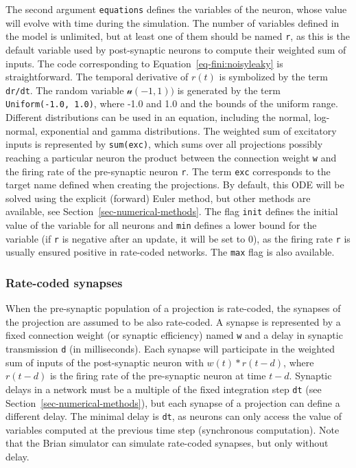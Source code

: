 \documentclass[
  11pt,
  a4paper,
]{scrbook}
\begin{document}
The second argument \texttt{equations} defines the variables of the
neuron, whose value will evolve with time during the simulation. The
number of variables defined in the model is unlimited, but at least one
of them should be named \texttt{r}, as this is the default variable used
by post-synaptic neurons to compute their weighted sum of inputs. The
code corresponding to Equation~\ref{eq-fini:noisyleaky} is
straightforward. The temporal derivative of \(r(t)\) is symbolized by
the term \texttt{dr/dt}. The random variable \(\mathcal{u}(-1, 1))\) is
generated by the term \texttt{Uniform(-1.0,\ 1.0)}, where -1.0 and 1.0
and the bounds of the uniform range. Different distributions can be used
in an equation, including the normal, log-normal, exponential and gamma
distributions. The weighted sum of excitatory inputs is represented by
\texttt{sum(exc)}, which sums over all projections possibly reaching a
particular neuron the product between the connection weight \texttt{w}
and the firing rate of the pre-synaptic neuron \texttt{r}. The term
\texttt{exc} corresponds to the target name defined when creating the
projections. By default, this ODE will be solved using the explicit
(forward) Euler method, but other methods are available, see
Section~\ref{sec-numerical-methods}. The flag \texttt{init} defines the
initial value of the variable for all neurons and \texttt{min} defines a
lower bound for the variable (if \texttt{r} is negative after an update,
it will be set to 0), as the firing rate \texttt{r} is usually ensured
positive in rate-coded networks. The \texttt{max} flag is also
available.

\subsubsection*{Rate-coded synapses}\label{rate-coded-synapses}

When the pre-synaptic population of a projection is rate-coded, the
synapses of the projection are assumed to be also rate-coded. A synapse
is represented by a fixed connection weight (or synaptic efficiency)
named \texttt{w} and a delay in synaptic transmission \texttt{d} (in
milliseconds). Each synapse will participate in the weighted sum of
inputs of the post-synaptic neuron with \(w(t) * r(t-d)\), where
\(r(t-d)\) is the firing rate of the pre-synaptic neuron at time
\(t-d\). Synaptic delays in a network must be a multiple of the fixed
integration step \texttt{dt} (see Section~\ref{sec-numerical-methods}),
but each synapse of a projection can define a different delay. The
minimal delay is \texttt{dt}, as neurons can only access the value of
variables computed at the previous time step (synchronous computation).
Note that the Brian simulator can simulate rate-coded synapses, but only
without delay.
\end{document}
